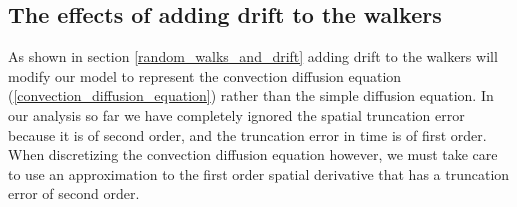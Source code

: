 \subsection{The effects of adding drift to the walkers}\label{effect_of_drift_on_walkers}

As shown in section \ref{random_walks_and_drift} adding drift to the walkers will modify our model to represent the convection diffusion equation (\ref{convection_diffusion_equation}) rather than the simple diffusion equation. 
In our analysis so far we have completely ignored the spatial truncation error because it is of second order, and the truncation error in time is of first order. 
When discretizing the convection diffusion equation however, we must take care to use an approximation to the first order spatial derivative that has a truncation error of second order. 

